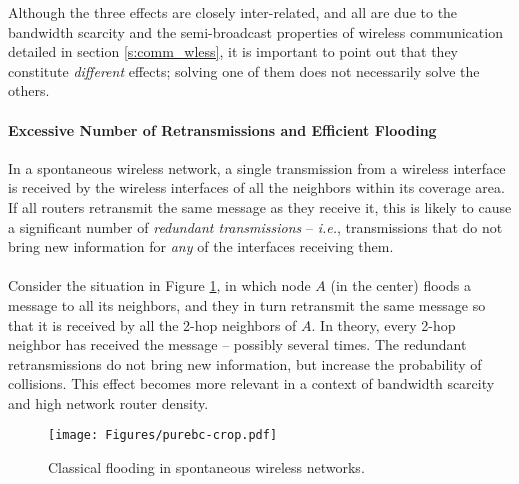 \begin{remark}
Although the three effects are closely inter-related, and all are due to the bandwidth scarcity and the semi-broadcast properties of wireless communication detailed in section \ref{s:comm_wless}, it is important to point out that they constitute {\em different} effects; solving one of them does not necessarily solve the others. 
\end{remark}

\paragraph{Excessive Number of Retransmissions and Efficient Flooding}

In a spontaneous wireless network, a single transmission from a wireless interface is received by the wireless interfaces of all the neighbors within its coverage area. If all routers retransmit the same message as they receive it, this is likely to cause a significant number of {\em redundant transmissions} -- {\em i.e.}, transmissions that do not bring new information for {\em any} of the interfaces receiving them. \ \\ \ \\
%
Consider the situation in Figure \ref{f:excessive}, in which node $A$ (in the center) floods a message to all its neighbors, and they in turn retransmit the same message so that it is received by all the 2-hop neighbors of $A$. In theory, every 2-hop neighbor has received the message -- possibly several times. The redundant retransmissions do not bring new information, but increase the probability of collisions. This effect becomes more relevant in a context of bandwidth scarcity and high network router density. %

\begin{figure}[h]
\centering
\texttt{[image: Figures/purebc-crop.pdf]}
\caption{Classical flooding in spontaneous wireless networks.}
\label{f:excessive}
\end{figure}

